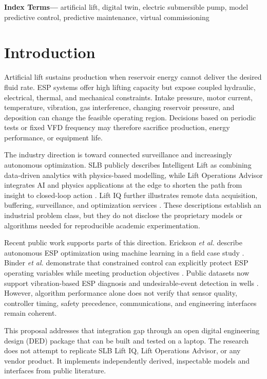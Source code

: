 \documentclass[conference]{IEEEtran}
\newenvironment{IEEEkeywords}{\small\noindent\textbf{Index Terms---}}{\par}
\begin{document}
\begin{IEEEkeywords}
artificial lift, digital twin, electric submersible pump, model predictive control, predictive maintenance, virtual commissioning
\end{IEEEkeywords}

\section{Introduction}
Artificial lift sustains production when reservoir energy cannot deliver the desired fluid rate. ESP systems offer high lifting capacity but expose coupled hydraulic, electrical, thermal, and mechanical constraints. Intake pressure, motor current, temperature, vibration, gas interference, changing reservoir pressure, and deposition can change the feasible operating region. Decisions based on periodic tests or fixed VFD frequency may therefore sacrifice production, energy performance, or equipment life.

The industry direction is toward connected surveillance and increasingly autonomous optimization. SLB publicly describes Intelligent Lift as combining data-driven analytics with physics-based modelling, while Lift Operations Advisor integrates AI and physics applications at the edge to shorten the path from insight to closed-loop action \cite{slb-intelligent,slb-loa}. Lift IQ further illustrates remote data acquisition, buffering, surveillance, and optimization services \cite{slb-liftiq}. These descriptions establish an industrial problem class, but they do not disclose the proprietary models or algorithms needed for reproducible academic experimentation.

Recent public work supports parts of this direction. Erickson \emph{et al.} describe autonomous ESP optimization using machine learning in a field case study \cite{erickson2024}. Binder \emph{et al.} demonstrate that constrained control can explicitly protect ESP operating variables while meeting production objectives \cite{binder2014}. Public datasets now support vibration-based ESP diagnosis and undesirable-event detection in wells \cite{varejao2024,vargas2026}. However, algorithm performance alone does not verify that sensor quality, controller timing, safety precedence, communications, and engineering interfaces remain coherent.

This proposal addresses that integration gap through an open digital engineering design (DED) package that can be built and tested on a laptop. The research does not attempt to replicate SLB Lift IQ, Lift Operations Advisor, or any vendor product. It implements independently derived, inspectable models and interfaces from public literature.
\end{document}
